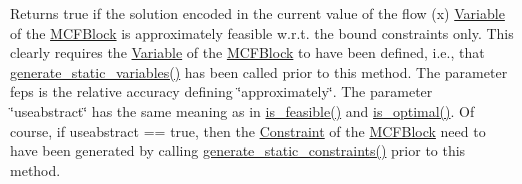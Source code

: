 Returns true if the solution encoded in the current value of the flow (x) \mbox{\hyperlink{class_s_m_spp__di__unipi__it_1_1_variable}{Variable}} of the \mbox{\hyperlink{class_s_m_spp__di__unipi__it_1_1_m_c_f_block}{M\+C\+F\+Block}} is approximately feasible w.\+r.\+t. the bound constraints only. This clearly requires the \mbox{\hyperlink{class_s_m_spp__di__unipi__it_1_1_variable}{Variable}} of the \mbox{\hyperlink{class_s_m_spp__di__unipi__it_1_1_m_c_f_block}{M\+C\+F\+Block}} to have been defined, i.\+e., that \mbox{\hyperlink{class_s_m_spp__di__unipi__it_1_1_m_c_f_block_a599bd50cdc6123555aa4a6c4e22c996d}{generate\+\_\+static\+\_\+variables()}} has been called prior to this method. The parameter feps is the relative accuracy defining \char`\"{}approximately\char`\"{}. The parameter \char`\"{}useabstract\char`\"{} has the same meaning as in \mbox{\hyperlink{class_s_m_spp__di__unipi__it_1_1_m_c_f_block_a162cd7d8375d705f0b15d8e847098763}{is\+\_\+feasible()}} and \mbox{\hyperlink{class_s_m_spp__di__unipi__it_1_1_m_c_f_block_a0b1e7ff87a97e692c97f52f096f6eb50}{is\+\_\+optimal()}}. Of course, if useabstract == true, then the \mbox{\hyperlink{class_s_m_spp__di__unipi__it_1_1_constraint}{Constraint}} of the \mbox{\hyperlink{class_s_m_spp__di__unipi__it_1_1_m_c_f_block}{M\+C\+F\+Block}} need to have been generated by calling \mbox{\hyperlink{class_s_m_spp__di__unipi__it_1_1_m_c_f_block_a33f94035590874ef8616982e11e7bb43}{generate\+\_\+static\+\_\+constraints()}} prior to this method. \mbox{\label{class_s_m_spp__di__unipi__it_1_1_m_c_f_block_a3d5efc1373ecc4f71e494c915663b6c4}} 
